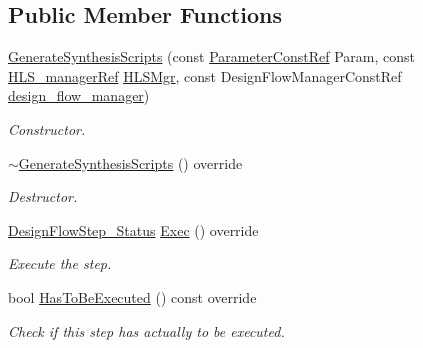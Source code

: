 \subsection*{Public Member Functions}
\begin{DoxyCompactItemize}
\item 
\hyperlink{classGenerateSynthesisScripts_a32f5da813140d858eb3876098b5e6924}{Generate\+Synthesis\+Scripts} (const \hyperlink{Parameter_8hpp_a37841774a6fcb479b597fdf8955eb4ea}{Parameter\+Const\+Ref} Param, const \hyperlink{hls__manager_8hpp_acd3842b8589fe52c08fc0b2fcc813bfe}{H\+L\+S\+\_\+manager\+Ref} \hyperlink{classHLS__step_ade85003a99d34134418451ddc46a18e9}{H\+L\+S\+Mgr}, const Design\+Flow\+Manager\+Const\+Ref \hyperlink{classDesignFlowStep_ab770677ddf087613add30024e16a5554}{design\+\_\+flow\+\_\+manager})
\begin{DoxyCompactList}\small\item\em Constructor. \end{DoxyCompactList}\item 
\hyperlink{classGenerateSynthesisScripts_a72a2722bb7f449ac6cd5f733a3a029df}{$\sim$\+Generate\+Synthesis\+Scripts} () override
\begin{DoxyCompactList}\small\item\em Destructor. \end{DoxyCompactList}\item 
\hyperlink{design__flow__step_8hpp_afb1f0d73069c26076b8d31dbc8ebecdf}{Design\+Flow\+Step\+\_\+\+Status} \hyperlink{classGenerateSynthesisScripts_aeba18d6961c98211710aa3ada02dc50e}{Exec} () override
\begin{DoxyCompactList}\small\item\em Execute the step. \end{DoxyCompactList}\item 
bool \hyperlink{classGenerateSynthesisScripts_ac7727b3364b8ec425960a093d5ba61ee}{Has\+To\+Be\+Executed} () const override
\begin{DoxyCompactList}\small\item\em Check if this step has actually to be executed. \end{DoxyCompactList}\end{DoxyCompactItemize}
